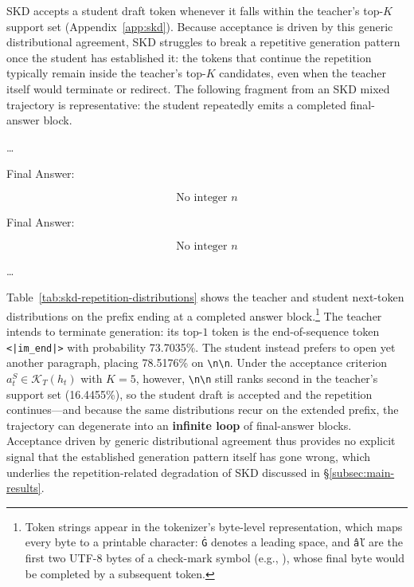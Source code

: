 \documentclass{article} %
\begin{document}
SKD accepts a student draft token whenever it falls within the teacher's top-$K$ support set (Appendix~\ref{app:skd}). Because acceptance is driven by this generic distributional agreement, SKD struggles to break a repetitive generation pattern once the student has established it: the tokens that continue the repetition typically remain inside the teacher's top-$K$ candidates, even when the teacher itself would terminate or redirect. The following fragment from an SKD mixed trajectory is representative: the student repeatedly emits a completed final-answer block.\par

\begin{promptbox}[title={SKD Mixed Trajectory}, breakable=false]
\small
\ldots\par

Final Answer:\par

\begin{equation*}
\boxed{\text{No integer } n}
\end{equation*}

Final Answer:\par

\begin{equation*}
\boxed{\text{No integer } n}
\end{equation*}

\ldots\par
\end{promptbox}



Table~\ref{tab:skd-repetition-distributions} shows the teacher and student next-token distributions on the prefix ending at a completed answer block.\footnote{Token strings appear in the tokenizer's byte-level representation, which maps every byte to a printable character: \texttt{\.G} denotes a leading space, and \texttt{\^a\v{l}} are the first two UTF-8 bytes of a check-mark symbol (e.g., \checkmark), whose final byte would be completed by a subsequent token.} The teacher intends to terminate generation: its top-$1$ token is the end-of-sequence token \texttt{<|im\_end|>} with probability 73.7035\%. The student instead prefers to open yet another paragraph, placing 78.5176\% on \texttt{\textbackslash n\textbackslash n}. Under the acceptance criterion $a_t^S\in\mathcal K_T(h_t)$ with $K=5$, however, \texttt{\textbackslash n\textbackslash n} still ranks second in the teacher's support set (16.4455\%), so the student draft is accepted and the repetition continues---and because the same distributions recur on the extended prefix, the trajectory can degenerate into an \textbf{infinite loop} of final-answer blocks. Acceptance driven by generic distributional agreement thus provides no explicit signal that the established generation pattern itself has gone wrong, which underlies the repetition-related degradation of SKD discussed in \S\ref{subsec:main-results}.\par
\end{document}
